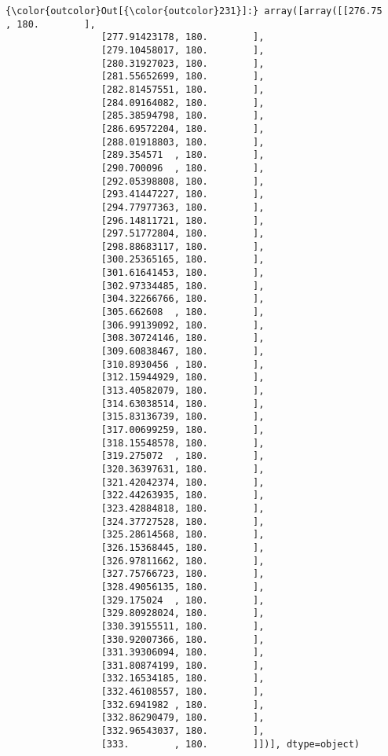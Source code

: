 \documentclass[11pt]{article}
\begin{document}
\begin{Verbatim}[commandchars=\\\{\}]
{\color{outcolor}Out[{\color{outcolor}231}]:} array([array([[276.75      , 180.        ],
                 [277.91423178, 180.        ],
                 [279.10458017, 180.        ],
                 [280.31927023, 180.        ],
                 [281.55652699, 180.        ],
                 [282.81457551, 180.        ],
                 [284.09164082, 180.        ],
                 [285.38594798, 180.        ],
                 [286.69572204, 180.        ],
                 [288.01918803, 180.        ],
                 [289.354571  , 180.        ],
                 [290.700096  , 180.        ],
                 [292.05398808, 180.        ],
                 [293.41447227, 180.        ],
                 [294.77977363, 180.        ],
                 [296.14811721, 180.        ],
                 [297.51772804, 180.        ],
                 [298.88683117, 180.        ],
                 [300.25365165, 180.        ],
                 [301.61641453, 180.        ],
                 [302.97334485, 180.        ],
                 [304.32266766, 180.        ],
                 [305.662608  , 180.        ],
                 [306.99139092, 180.        ],
                 [308.30724146, 180.        ],
                 [309.60838467, 180.        ],
                 [310.8930456 , 180.        ],
                 [312.15944929, 180.        ],
                 [313.40582079, 180.        ],
                 [314.63038514, 180.        ],
                 [315.83136739, 180.        ],
                 [317.00699259, 180.        ],
                 [318.15548578, 180.        ],
                 [319.275072  , 180.        ],
                 [320.36397631, 180.        ],
                 [321.42042374, 180.        ],
                 [322.44263935, 180.        ],
                 [323.42884818, 180.        ],
                 [324.37727528, 180.        ],
                 [325.28614568, 180.        ],
                 [326.15368445, 180.        ],
                 [326.97811662, 180.        ],
                 [327.75766723, 180.        ],
                 [328.49056135, 180.        ],
                 [329.175024  , 180.        ],
                 [329.80928024, 180.        ],
                 [330.39155511, 180.        ],
                 [330.92007366, 180.        ],
                 [331.39306094, 180.        ],
                 [331.80874199, 180.        ],
                 [332.16534185, 180.        ],
                 [332.46108557, 180.        ],
                 [332.6941982 , 180.        ],
                 [332.86290479, 180.        ],
                 [332.96543037, 180.        ],
                 [333.        , 180.        ]])], dtype=object)
\end{Verbatim}
            
\end{document}
